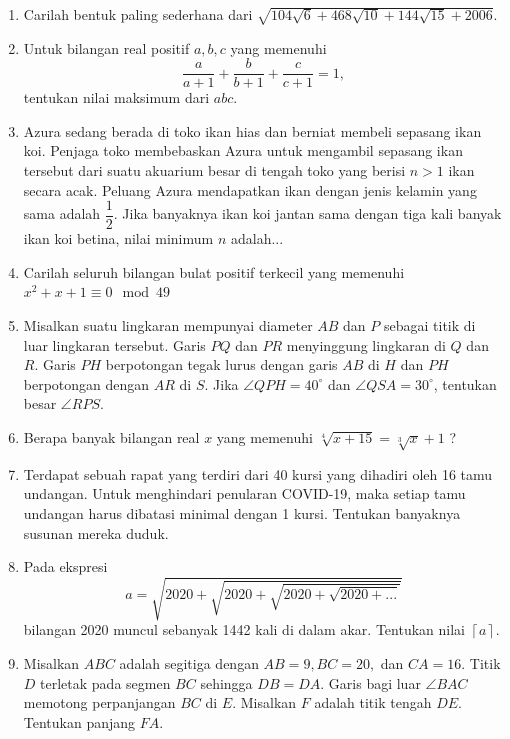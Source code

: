 \documentclass[12pt]{scrartcl}
\begin{document}
\begin{enumerate}[resume]
		\item Carilah bentuk paling sederhana dari $\sqrt{104\sqrt{6}+468\sqrt{10}+144\sqrt{15}+2006}$.
		
		\item Untuk bilangan real positif $a,b,c$ yang memenuhi $$\frac{a}{a+1}+\frac{b}{b+1}+\frac{c}{c+1} = 1,$$ tentukan nilai maksimum dari $abc$.
		
		\item Azura sedang berada di toko ikan hias dan berniat membeli sepasang ikan koi. Penjaga toko membebaskan Azura untuk mengambil sepasang ikan tersebut dari suatu akuarium besar di tengah toko yang berisi $n>1$ ikan secara acak. Peluang Azura mendapatkan ikan dengan jenis kelamin yang sama adalah $\dfrac12$. Jika banyaknya ikan koi jantan sama dengan tiga kali banyak ikan koi betina, nilai minimum $n$ adalah...
		
		\item Carilah seluruh bilangan bulat positif terkecil yang memenuhi $x^2+x+1 \equiv 0 \mod 49$
		
		\item Misalkan suatu lingkaran mempunyai diameter $AB$ dan $P$ sebagai titik di luar lingkaran tersebut. Garis $PQ$ dan $PR$ menyinggung lingkaran di $Q$ dan $R$. Garis $PH$ berpotongan tegak lurus dengan garis $AB$ di $H$ dan $PH$ berpotongan dengan $AR$ di $S$. Jika $\angle QPH = 40^\circ$ dan $\angle QSA = 30^\circ$, tentukan besar $\angle RPS$.
		
		\item Berapa banyak bilangan real $x$ yang memenuhi $\sqrt[4]{x+15} = \sqrt[3]{x}+1$ ?
		
		\item  Terdapat sebuah rapat yang terdiri dari 40 kursi yang dihadiri oleh 16 tamu undangan.
		Untuk menghindari penularan COVID-19, maka setiap tamu undangan harus dibatasi minimal
		dengan 1 kursi. Tentukan banyaknya susunan mereka duduk.

		
		\item Pada ekspresi $$a= \sqrt{2020+\sqrt{2020+\sqrt{2020+\sqrt{2020+...}}}}$$
		bilangan 2020 muncul sebanyak 1442 kali di dalam akar. Tentukan nilai $\left \lceil a \right \rceil$.
		
		\item Misalkan $ABC$ adalah segitiga dengan $AB=9, BC=20,$ dan $CA=16$. Titik $D$ terletak pada segmen $BC$ sehingga $DB=DA$. Garis bagi luar $\angle BAC$ memotong perpanjangan $BC$ di $E$. Misalkan $F$ adalah titik tengah $DE$. Tentukan panjang $FA$.
		

\end{enumerate}
\end{document}
